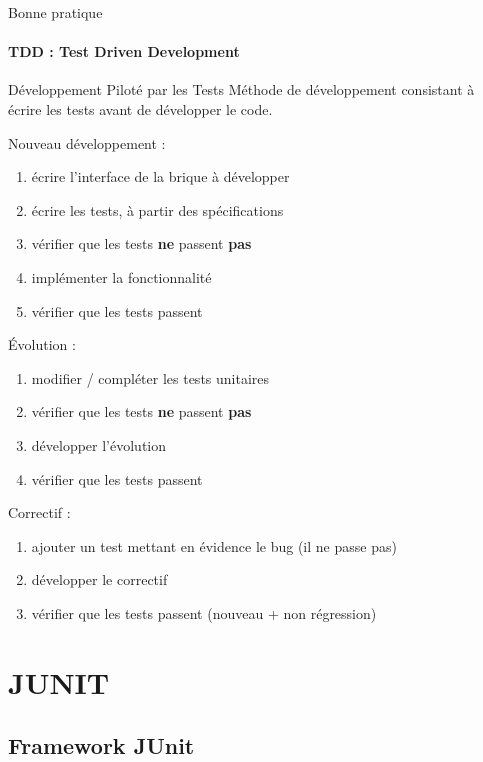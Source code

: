 \documentclass[compress]{beamer}%
\begin{document}
\begin{frame}{Bonne pratique}
	\framesubtitle{TDD : Test Driven Development}

	\begin{block}{Développement Piloté par les Tests}
		Méthode de développement consistant à écrire les tests avant de développer le code.
	\end{block}
	
	\pause
	Nouveau développement : 
	\begin{enumerate}[<+->]
		\item écrire l'interface de la brique à développer
		\item écrire les tests, à partir des spécifications
		\item vérifier que les tests \textbf{ne} passent \textbf{pas}
		\item implémenter la fonctionnalité
		\item vérifier que les tests passent
	\end{enumerate}
	
\end{frame}

\begin{frame}

	Évolution : 
	\pause
	\begin{enumerate}
		\item modifier / compléter les tests unitaires
		\item vérifier que les tests \textbf{ne} passent \textbf{pas}
		\item développer l'évolution
		\item vérifier que les tests passent
	\end{enumerate}
	
	\pause
	Correctif : 
	\begin{enumerate}
		\item ajouter un test mettant en évidence le bug (il ne passe pas)
		\item développer le correctif
		\item vérifier que les tests passent (nouveau + non régression)
	\end{enumerate}
\end{frame}


\section{JUNIT}

\subsection{Framework JUnit}
\end{document}
